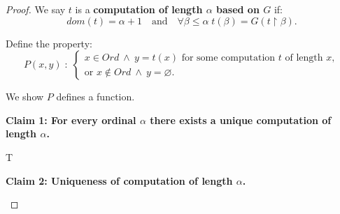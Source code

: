 \documentclass[10pt,a4paper]{book}
\let\emptyset\varnothing
\begin{document}
\begin{proof}

    We say $t$ is a \textbf{computation of length $\alpha$ based on $G$} if:
    \[
        dom(t)=\alpha+1
        \quad\text{and}\quad
        \forall \beta\le \alpha\; t(\beta)=G(t\upharpoonright \beta).
    \]

    Define the property:
    \[
        P(x,y)\;:\;
        \begin{cases}
            x\in Ord \ \land\ y=t(x) \text{ for some computation } t \text{ of length } x, \\
            \text{or } x\notin Ord \ \land\ y=\emptyset.
        \end{cases}
    \]

    We show $P$ defines a function.

    \textbf{Claim 1: For every ordinal $\alpha$ there exists a unique computation of length $\alpha$.}

    \begin{fitchproof}[arrayenv=tabular]


         
         

         

         
         T{}

         

         

         

    \end{fitchproof}

    \textbf{Claim 2: Uniqueness of computation of length $\alpha$.}

    \begin{fitchproof}[arrayenv=tabular]

         
         


\end{fitchproof}
\end{proof}
\end{document}
